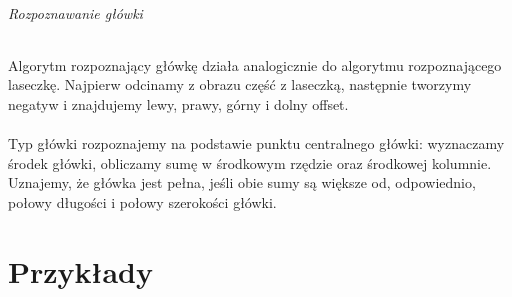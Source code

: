 \documentclass[12pt, letterpaper]{article}
\begin{document}
\paragraph*{Rozpoznawanie główki}
Algorytm rozpoznający główkę działa analogicznie do algorytmu
rozpoznającego laseczkę. Najpierw odcinamy z obrazu część z laseczką,
następnie tworzymy negatyw i znajdujemy lewy, prawy, górny i dolny offset.
\\\\
Typ główki rozpoznajemy na podstawie punktu centralnego główki:
wyznaczamy środek główki, obliczamy sumę w środkowym rzędzie
oraz środkowej kolumnie. Uznajemy, że główka jest pełna,
jeśli obie sumy są większe od, odpowiednio, połowy długości i
połowy szerokości główki.

\part*{Przykłady}
\end{document}
